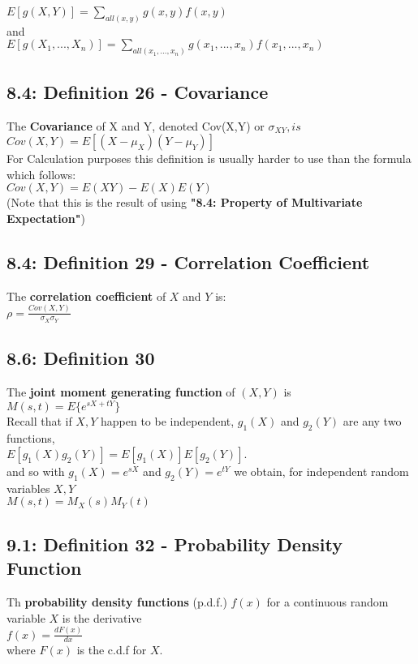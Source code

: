 \documentclass[11pt]{article}
\begin{document}
	

	$E[g(X,Y)]= \sum_{all(x,y)} g(x,y)f(x,y)$\\
	and\\
	$E[g(X_1,...,X_n)]= \sum_{all(x_1,...,x_n)} g(x_1,...,x_n)f(x_1,...,x_n)$\\
	
	
	
	\subsection*{8.4: Definition 26 - Covariance }
	The {\bf Covariance} of X and Y, denoted Cov(X,Y) or $\sigma_{XY}, is$\\
	$Cov(X,Y)=E[(X-\mu_X)(Y-\mu_Y)]$\\
	For Calculation purposes this definition is usually harder to use than the formula which follows:\\
	$Cov(X,Y)=E(XY)-E(X)E(Y)$\\
	(Note that this is the result of using {\bf "8.4: Property of Multivariate Expectation"})
	
	\subsection*{8.4: Definition 29 - Correlation Coefficient}
		The {\bf correlation coefficient} of $X$ and $Y$ is:\\
		$\rho = \frac{Cov(X,Y)}{\sigma_X\sigma_Y}$
	 \subsection*{8.6: Definition 30}
	 	The {\bf joint moment generating function} of $(X,Y)$ is \\
	 	$M(s,t)=E\{e^{sX+tY} \}$\\
	 	Recall that if $X,Y$ happen to be independent, $g_1(X)$ and $g_2(Y)$ are any two functions,\\
	 	$E[g_1(X)g_2(Y)]=E[g_1(X)]E[g_2(Y)]$.\\
	 	and so with $g_1(X)=e^{sX} $ and $g_2(Y) = e^{tY}$ we obtain, for independent random variables $X,Y$\\
	 	$M(s,t) = M_X(s)M_Y(t)$
	 	
	 \subsection*{9.1: Definition 32 - Probability Density Function}
	 	Th {\bf probability density functions} (p.d.f.) $f(x)$ for a continuous random variable $X$ is the derivative\\
	 	$f(x)= \frac {dF(x)}{dx}$\\
	 	where $F(x)$ is the c.d.f for $X$.
\end{document}
